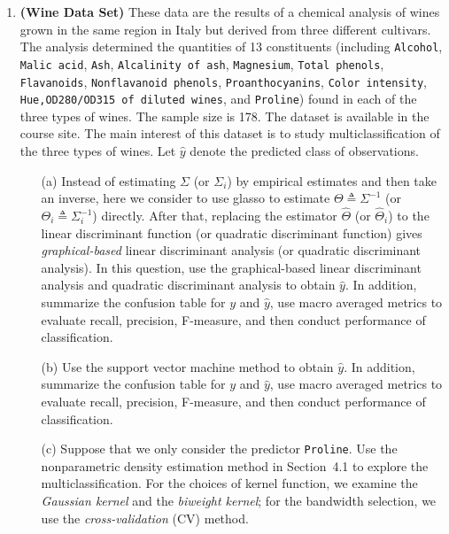 \documentclass[11pt]{article}
\begin{document}
\begin{enumerate}

\item {\bf (Wine Data Set)} These data are the results of a chemical analysis of wines grown in the same region in Italy but derived from three different cultivars. The analysis determined the quantities of 13 constituents (including  {\tt Alcohol}, {\tt Malic acid}, {\tt Ash}, {\tt Alcalinity of ash}, {\tt Magnesium}, {\tt Total phenols}, {\tt Flavanoids}, {\tt Nonflavanoid phenols}, {\tt Proanthocyanins}, {\tt Color intensity}, {\tt Hue,OD280/OD315 of diluted wines}, and {\tt Proline}) found in each of the three types of wines. The sample size is 178. The dataset is available in the course site. The main interest of this dataset is to study multiclassification of the three types of wines. Let $\widehat{y}$ denote the predicted class of observations.

\begin{itemize}

\item[(a)] Instead of estimating $\Sigma$ (or $\Sigma_i$) by empirical estimates and then take an inverse, here we consider to use glasso to estimate $\Theta \triangleq \Sigma^{-1}$ (or $\Theta_i \triangleq \Sigma_i^{-1}$) directly. After that, replacing the estimator $\widehat{\Theta}$ (or $\widehat{\Theta}_i$) to the linear discriminant function (or quadratic discriminant function) gives {\it graphical-based } linear discriminant analysis (or quadratic discriminant analysis). In this question, use the graphical-based linear discriminant analysis and quadratic discriminant analysis to obtain $\widehat{y}$. In addition, summarize the confusion table for $y$ and $\widehat{y}$, use macro averaged metrics to evaluate recall, precision, F-measure, and then conduct performance of classification.

\item[(b)] Use the support vector machine method to obtain $\widehat{y}$. In addition, summarize the confusion table for $y$ and $\widehat{y}$, use macro averaged metrics to evaluate recall, precision, F-measure, and then conduct performance of classification.

\item[(c)] Suppose that we only consider the predictor {\tt Proline}. Use the nonparametric density estimation method in Section~4.1 to explore the multiclassification. For the choices of kernel function, we examine the {\it Gaussian kernel} and the {\it biweight kernel}; for the bandwidth selection, we use the {\it cross-validation} (CV) method.


\end{itemize}
\end{enumerate}
\end{document}
